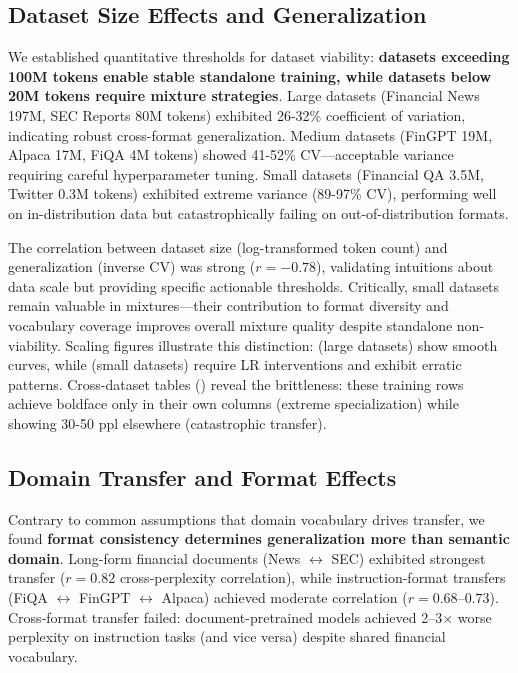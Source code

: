 \subsection{Dataset Size Effects and Generalization}

We established quantitative thresholds for dataset viability: \textbf{datasets exceeding 100M tokens enable stable standalone training, while datasets below 20M tokens require mixture strategies}. Large datasets (Financial News 197M, SEC Reports 80M tokens) exhibited 26-32\% coefficient of variation, indicating robust cross-format generalization. Medium datasets (FinGPT 19M, Alpaca 17M, FiQA 4M tokens) showed 41-52\% CV—acceptable variance requiring careful hyperparameter tuning. Small datasets (Financial QA 3.5M, Twitter 0.3M tokens) exhibited extreme variance (89-97\% CV), performing well on in-distribution data but catastrophically failing on out-of-distribution formats.

The correlation between dataset size (log-transformed token count) and generalization (inverse CV) was strong ($r = -0.78$), validating intuitions about data scale but providing specific actionable thresholds. Critically, small datasets remain valuable in mixtures—their contribution to format diversity and vocabulary coverage improves overall mixture quality despite standalone non-viability. Scaling figures illustrate this distinction:  (large datasets) show smooth curves, while  (small datasets) require LR interventions and exhibit erratic patterns. Cross-dataset tables () reveal the brittleness: these training rows achieve boldface only in their own columns (extreme specialization) while showing 30-50 ppl elsewhere (catastrophic transfer).

\subsection{Domain Transfer and Format Effects}

Contrary to common assumptions that domain vocabulary drives transfer, we found \textbf{format consistency determines generalization more than semantic domain}. Long-form financial documents (News $\leftrightarrow$ SEC) exhibited strongest transfer ($r = 0.82$ cross-perplexity correlation), while instruction-format transfers (FiQA $\leftrightarrow$ FinGPT $\leftrightarrow$ Alpaca) achieved moderate correlation ($r = 0.68$--$0.73$). Cross-format transfer failed: document-pretrained models achieved 2--3$\times$ worse perplexity on instruction tasks (and vice versa) despite shared financial vocabulary.

